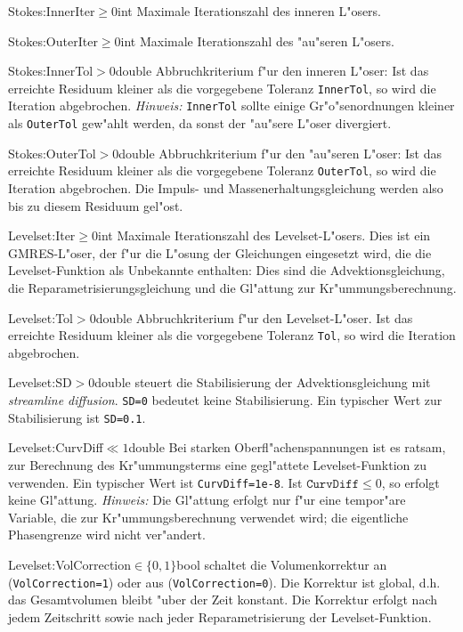 \begin{Desc}
{Stokes:InnerIter}{$\geq0$}{int}
Maximale Iterationszahl des inneren L"osers. 
\end{Desc}
%
\begin{Desc}
{Stokes:OuterIter}{$\geq0$}{int}
Maximale Iterationszahl des "au"seren L"osers.
\end{Desc}
%
\begin{Desc}
{Stokes:InnerTol}{$>0$}{double}
Abbruchkriterium f"ur den inneren L"oser: Ist das erreichte Residuum kleiner als
die vorgegebene Toleranz \verb|InnerTol|, so wird die Iteration abgebrochen.
\emph{Hinweis:} \verb|InnerTol| sollte einige Gr"o"senordnungen kleiner als
\verb|OuterTol| gew"ahlt werden, da sonst der "au"sere L"oser divergiert.
\end{Desc}
%
\begin{Desc}
{Stokes:OuterTol}{$>0$}{double}
Abbruchkriterium f"ur den "au"seren L"oser: Ist das erreichte Residuum kleiner 
als die vorgegebene Toleranz \verb|OuterTol|, so wird die Iteration abgebrochen.
Die Impuls- und Massenerhaltungsgleichung werden also bis zu diesem Residuum
gel"ost.
\end{Desc}


\begin{Desc}
{Levelset:Iter}{$\geq0$}{int}
Maximale Iterationszahl des Levelset-L"osers. Dies ist ein GMRES-L"oser, der 
f"ur die L"osung der Gleichungen eingesetzt wird, die die Levelset-Funktion 
als Unbekannte enthalten:
Dies sind die Advektionsgleichung, die Reparametrisierungsgleichung und die
Gl"attung zur Kr"ummungsberechnung. 
\end{Desc}
%
\begin{Desc}
{Levelset:Tol}{$>0$}{double}
Abbruchkriterium f"ur den Levelset-L"oser. Ist das erreichte Residuum kleiner 
als die vorgegebene Toleranz \verb|Tol|, so wird die Iteration abgebrochen.
\end{Desc}
%
\begin{Desc}
{Levelset:SD}{$>0$}{double}
steuert die Stabilisierung der Advektionsgleichung mit \emph{streamline 
diffusion}. \verb|SD=0| bedeutet keine Stabilisierung. Ein typischer Wert zur
Stabilisierung ist \verb|SD=0.1|.
\end{Desc}
%
\begin{Desc}
{Levelset:CurvDiff}{$\ll1$}{double}
Bei starken Oberfl"achenspannungen ist es ratsam, zur Berechnung des
Kr"ummungsterms eine gegl"attete Levelset-Funktion zu verwenden. Ein typischer
Wert ist \verb|CurvDiff=1e-8|. Ist $\mathtt{CurvDiff}\leq0$, so erfolgt keine 
Gl"attung. \emph{Hinweis:} Die Gl"attung erfolgt nur f"ur eine tempor"are
Variable, die zur Kr"ummungsberechnung verwendet wird; die eigentliche 
Phasengrenze wird nicht ver"andert.
\end{Desc}
%
\begin{Desc}
{Levelset:VolCorrection}{$\in\{0,1\}$}{bool}
schaltet die Volumenkorrektur an (\verb|VolCorrection=1|) oder aus 
(\verb|VolCorrection=0|). Die Korrektur ist global, d.h. das Gesamtvolumen
bleibt "uber der Zeit konstant. Die Korrektur erfolgt nach jedem Zeitschritt
sowie nach jeder Reparametrisierung der Levelset-Funktion.
\end{Desc}


